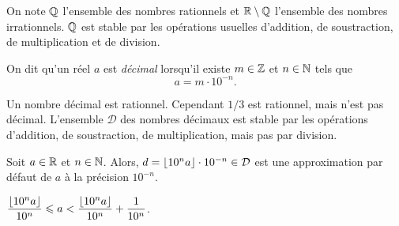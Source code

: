 \documentclass{magnoliaold}
\begin{document}
\begin{remarques}
\remarque On note $\mathbb{Q}$ l'ensemble des nombres rationnels et $\mathbb{R}\setminus\mathbb{Q}$ l'ensemble
  des nombres irrationnels. $\mathbb{Q}$ est stable par les opérations usuelles d'addition, de
	soustraction, de multiplication et de division.
\end{remarques}

\begin{definition}[utile=-3]
On dit qu'un réel $a$ est \emph{décimal} lorsqu'il existe $m\in\mathbb{Z}$ et $n\in\mathbb{N}$ tels
que
\[a=m\cdot 10^{-n}.\]
\end{definition}

\begin{remarques}
\remarque Un nombre décimal est rationnel. Cependant $1/3$ est rationnel, mais
  n'est pas décimal.
\remarque L'ensemble $\mathcal{D}$ des nombres décimaux est stable par les
  opérations d'addition, de soustraction, de multiplication, mais pas par
  division.
\end{remarques}

\begin{proposition}
Soit $a\in\mathbb{R}$ et $n\in\mathbb{N}$. Alors, $d=\left\lfloor10^n a\right\rfloor\cdot 10^{-n}\in\mathcal{D}$
est une approximation par défaut de $a$ à la précision $10^{-n}$.
\end{proposition}

\begin{preuve}
$\dfrac{\left\lfloor10^na\right\rfloor}{10^n}\leqslant a< \dfrac{\left\lfloor10^na\right\rfloor}{10^n}+\dfrac{1}{10^n}$.
\end{preuve}


\end{document}
